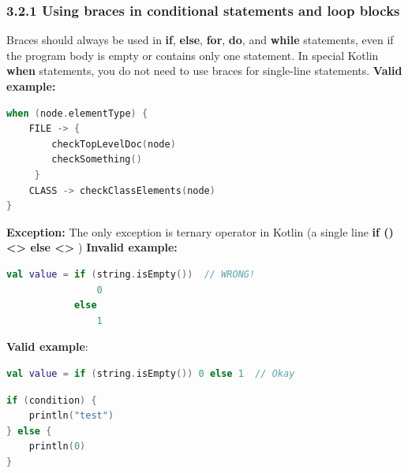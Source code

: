 \subsubsection*{\textbf{3.2.1 Using braces in conditional statements and loop blocks}}
\leavevmode\newline
\label{sec:3.2.1}
Braces should always be used in \textbf{if}, \textbf{else}, \textbf{for}, \textbf{do}, and \textbf{while} statements, even if the program body is empty or contains only one statement. In special Kotlin \textbf{when} statements, you do not need to use braces for single-line statements. 
\textbf{Valid example:}
\begin{lstlisting}[language=Kotlin]
when (node.elementType) {
    FILE -> {
        checkTopLevelDoc(node)
        checkSomething()
     }
    CLASS -> checkClassElements(node)
}
\end{lstlisting}
\textbf{Exception:} The only exception is ternary operator in Kotlin (a single line \textbf{if () <> else <>} ) 
\textbf{Invalid example:}
\begin{lstlisting}[language=Kotlin]
val value = if (string.isEmpty())  // WRONG!
                0
            else
                1
\end{lstlisting}
\textbf{Valid example}: 
\begin{lstlisting}[language=Kotlin]
val value = if (string.isEmpty()) 0 else 1  // Okay
\end{lstlisting}
\begin{lstlisting}[language=Kotlin]
if (condition) {
    println("test")
} else {
    println(0)
}
\end{lstlisting}
